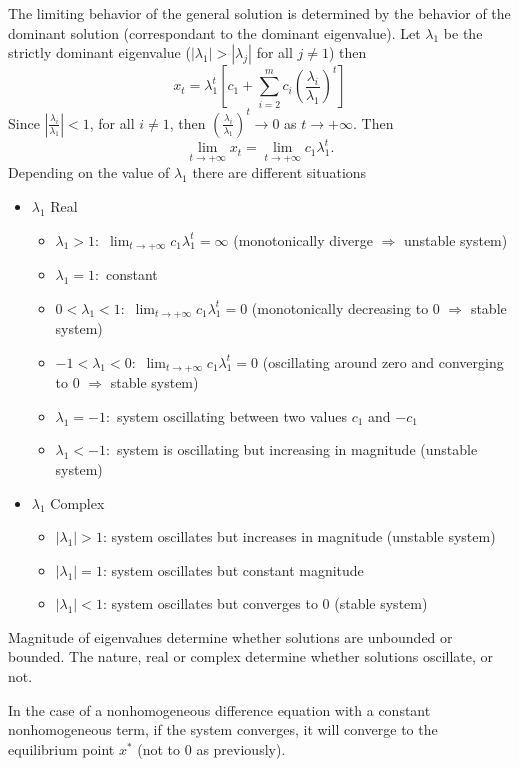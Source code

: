 The limiting behavior of the general solution is determined by the behavior of the dominant solution (correspondant to the dominant eigenvalue). Let $\lambda _1$ be the strictly dominant eigenvalue ($|\lambda _1|> |\lambda _j|$ for all $j\not =1$) then
$$x_t=\lambda _1^t\left[ c_1+\sum_{i=2}^m c_i\left ( \frac{\lambda_i}{\lambda_1}\right )^t\right ]$$
Since $\left |\frac{\lambda _i}{\lambda _1}\right |<1$, for all $i\not =1$, then $\left ( \frac{\lambda_i}{\lambda_1}\right )^t\rightarrow 0$ as $t\rightarrow +\infty$. Then $$\lim _{t\rightarrow +\infty }x_t=\lim _{t\rightarrow +\infty }c_1\lambda _1^t.$$
Depending on the value of $\lambda _1$ there are different situations
\begin{itemize}
\item $\lambda _1$ Real
\begin{itemize}
\item $\lambda _1 >1:$ $\lim _{t\rightarrow +\infty }c_1\lambda _1^t=\infty$ (monotonically diverge $\Rightarrow$ unstable system)
\item $\lambda _1 =1:$ constant
\item $0 <\lambda _1 <1:$ $\lim _{t\rightarrow +\infty }c_1\lambda _1^t=0$ (monotonically decreasing to 0 $\Rightarrow$ stable system)
\item $-1 <\lambda _1 <0:$ $\lim _{t\rightarrow +\infty }c_1\lambda _1^t=0$ (oscillating around zero and converging to 0 $\Rightarrow$ stable system)
\item $\lambda _1 =-1:$ system oscillating between two values $c_1$ and $-c_1$
\item $\lambda _1 <-1:$ system is oscillating but increasing in magnitude (unstable system)
\end{itemize}
\item $\lambda _1$ Complex
\begin{itemize}
\item $|\lambda _1|>1$: system oscillates but increases in magnitude (unstable system)
\item $|\lambda _1|=1$: system oscillates but constant magnitude 
\item $|\lambda _1|<1$: system oscillates but converges to 0 (stable system)
\end{itemize}
\end{itemize}

Magnitude of eigenvalues determine whether solutions are unbounded or bounded. The nature, real or complex determine whether solutions oscillate, or not.

In the case of a nonhomogeneous difference equation with a constant nonhomogeneous term, if the system converges, it will converge to the equilibrium point $x^*$ (not to $0$ as previously).



